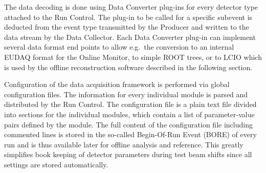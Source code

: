 The data decoding is done using Data Converter plug-ins for every detector type attached to the Run Control. 
The plug-in to be called for a specific subevent is deducted from the event type transmitted by the Producer and written to the data stream by the Data Collector. 
Each Data Converter plug-in can implement several data format end points to allow e.g.\ the conversion to an internal EUDAQ format for the Online Monitor, to simple ROOT trees, or to LCIO
 which is used by the offline reconstruction software described in the following section.

Configuration of the data acquisition framework is performed via global configuration files. 
The information for every individual module is parsed and distributed by the Run Control. 
The configuration file is a plain text file divided into sections for the individual modules, which contain a list of parameter-value pairs defined by the module.
The full content of the configuration file including commented lines is stored in the so-called Begin-Of-Run Event (BORE) of every run and is thus available later for offline analysis and reference. 
This greatly simplifies book keeping of detector parameters during test beam shifts since all settings are stored automatically.
